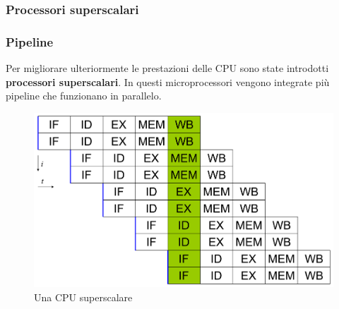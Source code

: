 \subsubsection[Processori superscalari]{Processori superscalari}

\begin{frame}
	\frametitle{ Pipeline}
	Per migliorare ulteriormente le prestazioni delle CPU sono state introdotti \textbf{processori superscalari}. In questi microprocessori vengono integrate più pipeline che funzionano in parallelo.
	
		\begin{figure}[!htbp]
			\centering 
			\includegraphics[width=0.7\linewidth]{images/7_pipeline/pipeline_superscalar.pdf}
			\caption{Una CPU superscalare}
			\label{fig:pipeline_superscalar}
		\end{figure}

\end{frame}





